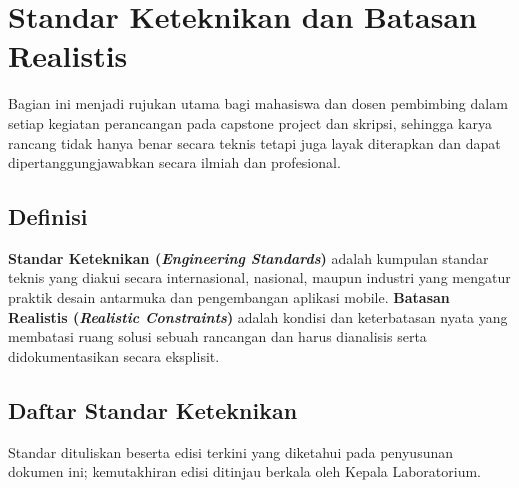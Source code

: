 \documentclass[12pt,a4paper]{report}
\begin{document}
\chapter{Standar Keteknikan dan Batasan Realistis}
\label{chap:standar}

Bagian ini menjadi rujukan utama bagi mahasiswa dan dosen pembimbing dalam setiap kegiatan perancangan pada capstone project dan skripsi, sehingga karya rancang tidak hanya benar secara teknis tetapi juga layak diterapkan dan dapat dipertanggungjawabkan secara ilmiah dan profesional.

\section{Definisi}
\textbf{Standar Keteknikan (\emph{Engineering Standards})} adalah kumpulan standar teknis yang diakui secara internasional, nasional, maupun industri yang mengatur praktik desain antarmuka dan pengembangan aplikasi mobile. \textbf{Batasan Realistis (\emph{Realistic Constraints})} adalah kondisi dan keterbatasan nyata yang membatasi ruang solusi sebuah rancangan dan harus dianalisis serta didokumentasikan secara eksplisit.

\section{Daftar Standar Keteknikan}
Standar dituliskan beserta edisi terkini yang diketahui pada penyusunan dokumen ini; kemutakhiran edisi ditinjau berkala oleh Kepala Laboratorium.
\end{document}
